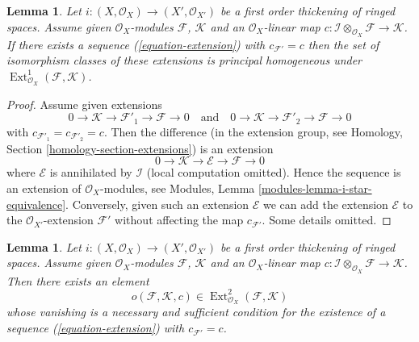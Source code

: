 \documentclass{stacks-project}
\theoremstyle{plain}
\newtheorem{lemma}[subsection]{Lemma}
\theoremstyle{definition}
\theoremstyle{remark}
\numberwithin{equation}{subsection}
\def\Ext{\mathop{\mathrm{Ext}}\nolimits}
\begin{document}
\begin{lemma}
\label{lemma-inf-ext}
Let $i : (X, \mathcal{O}_X) \to (X', \mathcal{O}_{X'})$ be a first order
thickening of ringed spaces.
Assume given $\mathcal{O}_X$-modules $\mathcal{F}$, $\mathcal{K}$
and an $\mathcal{O}_X$-linear map
$c : \mathcal{I} \otimes_{\mathcal{O}_X} \mathcal{F} \to \mathcal{K}$.
If there exists a sequence (\ref{equation-extension}) with
$c_{\mathcal{F}'} = c$ then the set of isomorphism classes of these
extensions is principal homogeneous under
$\Ext^1_{\mathcal{O}_X}(\mathcal{F}, \mathcal{K})$.
\end{lemma}

\begin{proof}
Assume given extensions
$$
0 \to \mathcal{K} \to \mathcal{F}'_1 \to \mathcal{F} \to 0
\quad\text{and}\quad
0 \to \mathcal{K} \to \mathcal{F}'_2 \to \mathcal{F} \to 0
$$
with $c_{\mathcal{F}'_1} = c_{\mathcal{F}'_2} = c$. Then the difference
(in the extension group, see
Homology, Section \ref{homology-section-extensions})
is an extension
$$
0 \to \mathcal{K} \to \mathcal{E} \to \mathcal{F} \to 0
$$
where $\mathcal{E}$ is annihilated by $\mathcal{I}$ (local computation
omitted). Hence the sequence is an extension of $\mathcal{O}_X$-modules,
see Modules, Lemma \ref{modules-lemma-i-star-equivalence}.
Conversely, given such an extension $\mathcal{E}$ we can add the extension
$\mathcal{E}$ to the $\mathcal{O}_{X'}$-extension $\mathcal{F}'$ without
affecting the map $c_{\mathcal{F}'}$. Some details omitted.
\end{proof}

\begin{lemma}
\label{lemma-inf-obs-ext}
Let $i : (X, \mathcal{O}_X) \to (X', \mathcal{O}_{X'})$
be a first order thickening of ringed spaces. Assume given
$\mathcal{O}_X$-modules $\mathcal{F}$, $\mathcal{K}$
and an $\mathcal{O}_X$-linear map
$c : \mathcal{I} \otimes_{\mathcal{O}_X} \mathcal{F} \to \mathcal{K}$.
Then there exists an element
$$
o(\mathcal{F}, \mathcal{K}, c) \in
\Ext^2_{\mathcal{O}_X}(\mathcal{F}, \mathcal{K})
$$
whose vanishing is a necessary and sufficient condition for the existence
of a sequence (\ref{equation-extension}) with $c_{\mathcal{F}'} = c$.
\end{lemma}
\end{document}

